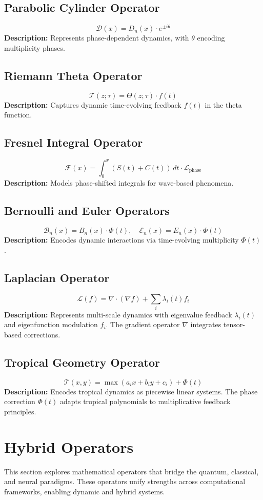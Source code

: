 \documentclass{article}
\theoremstyle{plain}
\begin{document}
\begin{itemize}
\subsection{Parabolic Cylinder Operator}
\[
\mathcal{D}(x) = D_n(x) \cdot e^{\pm i\theta}
\]
\textbf{Description:} Represents phase-dependent dynamics, with $\theta$ encoding multiplicity phases.

\subsection{Riemann Theta Operator}
\[
\mathcal{T}(z; \tau) = \Theta(z; \tau) \cdot f(t)
\]
\textbf{Description:} Captures dynamic time-evolving feedback $f(t)$ in the theta function.

\subsection{Fresnel Integral Operator}
\[
\mathcal{F}(x) = \int_0^x \left( S(t) + C(t) \right) \, dt \cdot \mathcal{L}_{\text{phase}}
\]
\textbf{Description:} Models phase-shifted integrals for wave-based phenomena.

\subsection{Bernoulli and Euler Operators}
\[
\mathcal{B}_n(x) = B_n(x) \cdot \Phi(t), \quad \mathcal{E}_n(x) = E_n(x) \cdot \Phi(t)
\]
\textbf{Description:} Encodes dynamic interactions via time-evolving multiplicity $\Phi(t)$.
\subsection{Laplacian Operator}
\[
\mathcal{L}(f) = \nabla \cdot (\nabla f) + \sum_{i} \lambda_i(t) f_i
\]
\textbf{Description:} Represents multi-scale dynamics with eigenvalue feedback $\lambda_i(t)$ and eigenfunction modulation $f_i$. The gradient operator $\nabla$ integrates tensor-based corrections.

\subsection{Tropical Geometry Operator}
\[
\mathcal{T}(x, y) = \max(a_i x + b_i y + c_i) + \Phi(t)
\]
\textbf{Description:} Encodes tropical dynamics as piecewise linear systems. The phase correction $\Phi(t)$ adapts tropical polynomials to multiplicative feedback principles.

\section{Hybrid Operators}
This section explores mathematical operators that bridge the quantum, classical, and neural paradigms. These operators unify strengths across computational frameworks, enabling dynamic and hybrid systems.


\end{itemize}
\end{document}
